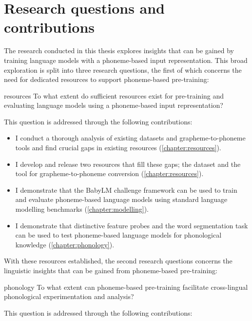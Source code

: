 \section{Research questions and contributions}

The research conducted in this thesis explores insights that can be gained by training language models with a phoneme-based input representation. This broad exploration is split into three research questions, the first of which concerns the need for dedicated resources to support phoneme-based pre-training:

\begin{question}{}{resources}
    To what extent do sufficient resources exist for pre-training and evaluating language models using a phoneme-based input representation?
\end{question}

This question is addressed through the following contributions:

\begin{itemize}
    \item I conduct a thorough analysis of existing datasets and grapheme-to-phoneme tools and find crucial gaps in existing resources (\cref{chapter:resources}).
    \item I develop and release two resources that fill these gaps; the \ipachildes dataset and the \gpp tool for grapheme-to-phoneme conversion (\cref{chapter:resources}).
    \item I demonstrate that the BabyLM challenge framework can be used to train and evaluate phoneme-based language models using standard language modelling benchmarks (\cref{chapter:modelling}).
    \item I demonstrate that distinctive feature probes and the word segmentation task can be used to test phoneme-based language models for phonological knowledge (\cref{chapter:phonology}).
\end{itemize}

With these resources established, the second research questions concerns the linguistic insights that can be gained from phoneme-based pre-training:

\begin{question}{}{phonology}
    To what extent can phoneme-based pre-training facilitate cross-lingual phonological experimentation and analysis?
\end{question}

This question is addressed through the following contributions:


